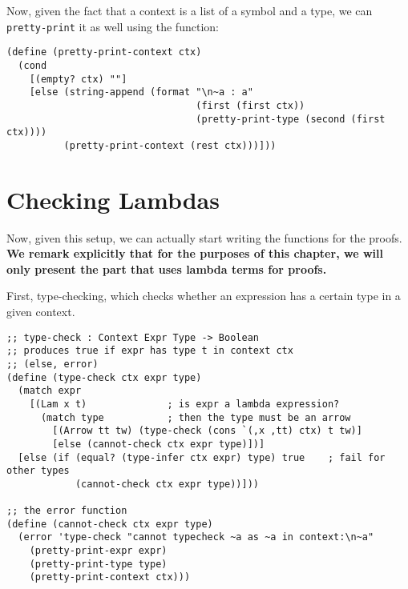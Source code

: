 Now, given the fact that a context is a list of a symbol and a type,
we can \texttt{pretty-print} it as well using the function:
{
  \small
\begin{verbatim}
(define (pretty-print-context ctx)
  (cond
    [(empty? ctx) ""]
    [else (string-append (format "\n~a : a"
                                 (first (first ctx))
                                 (pretty-print-type (second (first ctx))))
          (pretty-print-context (rest ctx)))]))
\end{verbatim}
}

\section{Checking Lambdas}

Now, given this setup, we can actually start writing the functions
for the proofs. \textbf{We remark explicitly that for the purposes %
  of this chapter, we will only present the part that uses lambda terms
  for proofs.}

First, type-checking, which checks whether an
expression has a certain type in a given context.
{
  \small
\begin{verbatim}
;; type-check : Context Expr Type -> Boolean
;; produces true if expr has type t in context ctx
;; (else, error)
(define (type-check ctx expr type)
  (match expr
    [(Lam x t)              ; is expr a lambda expression?
      (match type           ; then the type must be an arrow
        [(Arrow tt tw) (type-check (cons `(,x ,tt) ctx) t tw)]
        [else (cannot-check ctx expr type)])]
  [else (if (equal? (type-infer ctx expr) type) true    ; fail for other types
            (cannot-check ctx expr type))]))

;; the error function
(define (cannot-check ctx expr type)
  (error 'type-check "cannot typecheck ~a as ~a in context:\n~a"
    (pretty-print-expr expr)
    (pretty-print-type type)
    (pretty-print-context ctx)))
\end{verbatim}
}

